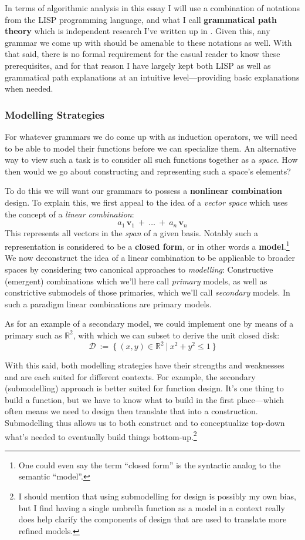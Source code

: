 \documentclass[twoside]{article}
\newcommand{\strong}[1]{{\bfseries #1}}
\newcommand{\bv}[1][v]{\mathbf{#1}}
\begin{document}
In terms of algorithmic analysis in this essay I will use a combination of notations from the LISP programming language,
and what I call \strong{grammatical path theory} which is independent research I've written up in \cite{nikfs}. Given this,
any grammar we come up with should be amenable to these notations as well. With that said, there is no formal requirement for
the casual reader to know these prerequisites, and for that reason I have largely kept both LISP as well as grammatical path
explanations at an intuitive level---providing basic explanations when needed.

\subsubsection*{Modelling Strategies}

For whatever grammars we do come up with as induction operators, we will need to be able to model their functions
before we can specialize them. An alternative way to view such a task is to consider all such functions together
as a \emph{space}. How then would we go about constructing and representing such a space's elements?

To do this we will want our grammars to possess a \strong{nonlinear combination} design. To explain this,
we first appeal to the idea of a \emph{vector space} which uses the concept of a \emph{linear combination}:
$$ a_1\,\bv_1\ +\ \ldots\ +\ a_n\,\bv_n $$
This represents all vectors in the \emph{span} of a given basis. Notably such a representation is considered to be a
\strong{closed form}, or in other words a \strong{model}.\footnote{One could even say the term ``closed form'' is the
syntactic analog to the semantic ``model''.} We now deconstruct the idea of a linear combination to be applicable to
broader spaces by considering two canonical approaches to \emph{modelling}: Constructive (emergent) combinations which
we'll here call \emph{primary} models, as well as constrictive submodels of those primaries, which we'll call
\emph{secondary} models. In such a paradigm linear combinations are primary models.

As for an example of a secondary model, we could implement one by means of a primary such as $ \mathbb{R}^2 $,
with which we can subset to derive the unit closed disk:
$$ \mathcal{D}\ :=\ \{\ (x,y)\in\mathbb{R}^2\ |\ x^2+y^2 \le 1\ \} $$

With this said, both modelling strategies have their strengths and weaknesses and are each suited for different contexts.
For example, the secondary (submodelling) approach is better suited for function design. It's one thing to build a function,
but we have to know what to build in the first place---which often means we need to design then translate that into
a construction. Submodelling thus allows us to both construct and to conceptualize top-down what's needed to eventually
build things bottom-up.\footnote{I should mention that using submodelling for design is possibly my own bias, but I find
having a single umbrella function as a model in a context really does help clarify the components of design that are used
to translate more refined models.}
\end{document}
